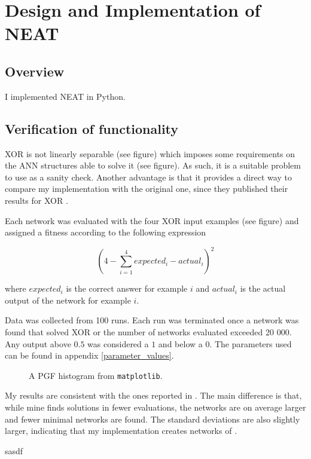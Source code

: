
\newpage
\section{Design and Implementation of NEAT}
\subsection{Overview}
I implemented NEAT in Python.

\subsection{Verification of functionality}
XOR is not linearly separable (see figure) which imposes some requirements on the ANN structures able to solve it (see figure).
As such, it is a suitable problem to use as a sanity check. Another advantage is that it provides a direct way to compare my
implementation with the original one, since they published their results for XOR \cite{neat_main}.

Each network was evaluated with the four XOR input examples (see figure) and assigned a fitness according to the following expression

\begin{equation*} \label{eq:1}
    (4 - \sum_{i=1}^{4} expected_{i} - actual_{i})^2
\end{equation*}

where $expected_{i}$ is the correct answer for example $i$ and $actual_{i}$ is the actual output of the network for example $i$.

Data was collected from 100 runs. Each run was terminated once a network was found that solved
XOR or the number of networks evaluated exceeded 20 000. Any output above $0.5$ was considered a $1$ and below a $0$.
The parameters used can be found in appendix \ref{parameter_values}.

\begin{figure}
    \begin{center}
        
    \end{center}
    \caption{A PGF histogram from \texttt{matplotlib}.}
\end{figure}

My results are consistent with the ones reported in \cite{neat_main}. The main difference
is that, while mine finds solutions in fewer evaluations, the networks are on average larger and
fewer minimal networks are found. The standard deviations are also slightly larger, indicating that
my implementation creates networks of .


\prntlen{\textwidth}


sasdf
